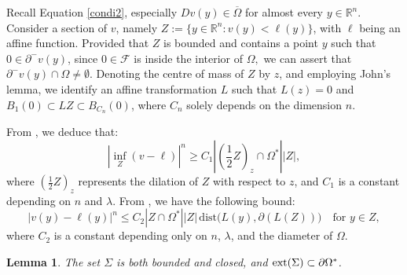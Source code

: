 \documentclass[11pt]{amsart}
\theoremstyle{plain}
\newtheorem{lemma}{Lemma}[section]
\newcommand{\0}{\textbf{0}}
\numberwithin{equation}{section}
\numberwithin{equation}{section}
\numberwithin{figure}{section}
\begin{document}
Recall Equation \eqref{condi2}, especially $Dv(y) \in \overline{\Omega}$ for almost every $y\in \mathbb{R}^n.$ 
Consider a section of \(v\), namely \(Z:=\{y \in \mathbb{R}^n : v(y) < \ell(y)\}\), with \(\ell\) being an affine function. Provided that \(Z\) is bounded and contains a point \(y\) such that \(0 \in \partial^{-}v(y)\), since \(0\in \mathcal{F}\) is inside the interior of \(\Omega,\)
 we can assert that \(\partial^{-}v(y) \cap \Omega \neq\emptyset\). 
 Denoting the centre of mass of \(Z\) by \(z\), and employing John's lemma, we identify an affine transformation \(L\) such that $L(z)=0$ and \(B_1(0) \subset LZ \subset B_{C_n}(0)\), where \(C_n\) solely depends on the dimension \(n\). 

From \cite[Inequality (4)]{FK1}, we deduce that:
\begin{equation}\label{la1}
|\inf_{Z} (v-\ell)|^n \geq C_1 \left| \left( \frac{1}{2}Z \right)_{z} \cap \Omega^* \right| |Z|,
\end{equation}
where $\left(\frac{1}{2}Z\right)_{z}$ represents the dilation of $Z$ with respect to $z$, and $C_1$ is a constant depending on $n$ and $\lambda$.
From \cite[Proposition 1]{FK1}, we have the following bound:
\begin{equation}\label{ua1}
|v(y) - \ell(y)|^n \leq C_2 |Z \cap \Omega^*||Z| \, \text{dist}\big(L(y), \partial(L(Z))\big) \quad\mbox{for } y\in Z,
\end{equation}
where $C_2$ is a constant depending only on $n$, $\lambda$, and the diameter of $\Omega$.






\begin{lemma}\label{sc111}
The set $\Sigma$ is both bounded and closed, and $\text{\normalfont ext}(\Sigma)\subset \partial\Omega^*$.
\end{lemma}
\end{document}

